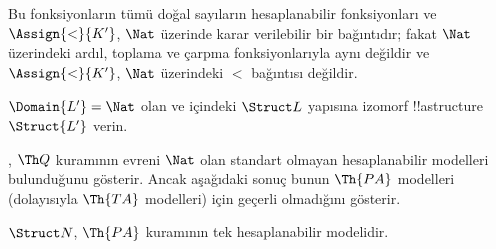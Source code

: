 \begin{ex}
Bu fonksiyonların tümü doğal sayıların hesaplanabilir fonksiyonları ve
$\Assign{<}{K'}$, $\Nat$ üzerinde karar verilebilir bir bağıntıdır;
fakat $\Nat$ üzerindeki ardıl, toplama ve çarpma fonksiyonlarıyla aynı
değildir ve $\Assign{<}{K'}$, $\Nat$ üzerindeki $<$ bağıntısı değildir.
\end{ex}

\begin{prob}
$\Domain{L'}=\Nat$ olan ve
 içindeki $\Struct L$ yapısına
izomorf !!a{structure}~$\Struct{L'}$ verin.
\end{prob}

\begin{explain}
, $\Th Q$ kuramının evreni $\Nat$ olan standart
olmayan hesaplanabilir modelleri bulunduğunu gösterir. Ancak aşağıdaki
sonuç bunun $\Th{PA}$ modelleri (dolayısıyla $\Th{TA}$ modelleri) için
geçerli olmadığını gösterir.
\end{explain}

\begin{thm}
$\Struct N$, $\Th{PA}$ kuramının tek hesaplanabilir modelidir.
\end{thm}

